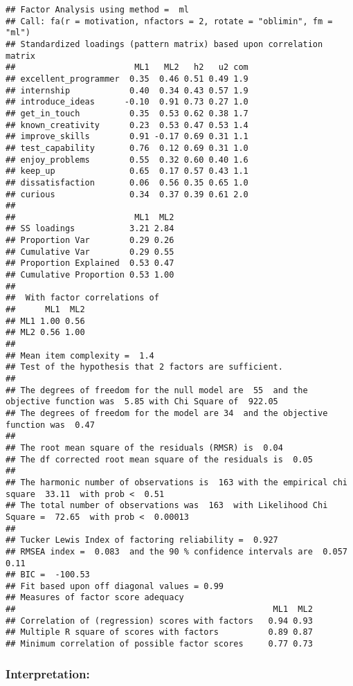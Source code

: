 \documentclass[
]{article}
\begin{document}
\begin{verbatim}
## Factor Analysis using method =  ml
## Call: fa(r = motivation, nfactors = 2, rotate = "oblimin", fm = "ml")
## Standardized loadings (pattern matrix) based upon correlation matrix
##                        ML1   ML2   h2   u2 com
## excellent_programmer  0.35  0.46 0.51 0.49 1.9
## internship            0.40  0.34 0.43 0.57 1.9
## introduce_ideas      -0.10  0.91 0.73 0.27 1.0
## get_in_touch          0.35  0.53 0.62 0.38 1.7
## known_creativity      0.23  0.53 0.47 0.53 1.4
## improve_skills        0.91 -0.17 0.69 0.31 1.1
## test_capability       0.76  0.12 0.69 0.31 1.0
## enjoy_problems        0.55  0.32 0.60 0.40 1.6
## keep_up               0.65  0.17 0.57 0.43 1.1
## dissatisfaction       0.06  0.56 0.35 0.65 1.0
## curious               0.34  0.37 0.39 0.61 2.0
## 
##                        ML1  ML2
## SS loadings           3.21 2.84
## Proportion Var        0.29 0.26
## Cumulative Var        0.29 0.55
## Proportion Explained  0.53 0.47
## Cumulative Proportion 0.53 1.00
## 
##  With factor correlations of 
##      ML1  ML2
## ML1 1.00 0.56
## ML2 0.56 1.00
## 
## Mean item complexity =  1.4
## Test of the hypothesis that 2 factors are sufficient.
## 
## The degrees of freedom for the null model are  55  and the objective function was  5.85 with Chi Square of  922.05
## The degrees of freedom for the model are 34  and the objective function was  0.47 
## 
## The root mean square of the residuals (RMSR) is  0.04 
## The df corrected root mean square of the residuals is  0.05 
## 
## The harmonic number of observations is  163 with the empirical chi square  33.11  with prob <  0.51 
## The total number of observations was  163  with Likelihood Chi Square =  72.65  with prob <  0.00013 
## 
## Tucker Lewis Index of factoring reliability =  0.927
## RMSEA index =  0.083  and the 90 % confidence intervals are  0.057 0.11
## BIC =  -100.53
## Fit based upon off diagonal values = 0.99
## Measures of factor score adequacy             
##                                                    ML1  ML2
## Correlation of (regression) scores with factors   0.94 0.93
## Multiple R square of scores with factors          0.89 0.87
## Minimum correlation of possible factor scores     0.77 0.73
\end{verbatim}

\hypertarget{interpretation-11}{%
\subsubsection{Interpretation:}\label{interpretation-11}}
\end{document}
